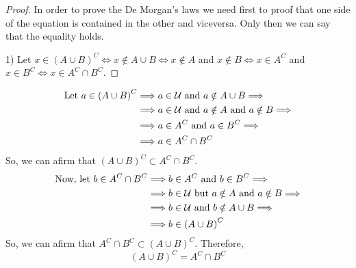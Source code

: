 \begin{proof}
    In order to prove the De Morgan's laws we need first to proof that one side of the equation is contained in the other and viceversa. Only then we can say that the equality holds.

    1) Let $x\in\left( A\cup B \right)^C \iff x\not\in A\cup B \iff x\not\in A$ and $x\not\in B \iff x\in A^C$ and $x\in B^C \iff x\in A^C\cap B^C$.
\end{proof}
    \begin{align}
        \textrm{Let } a\in\left( A\cup B \right)^C &\Longrightarrow a\in\mathcal{U}\textrm{ and } a\notin A\cup B \Longrightarrow \\
                                     &\Longrightarrow a\in\mathcal{U}\textrm{ and } a\notin A\textrm{ and } a\notin B \Longrightarrow \\ &\Longrightarrow a\in A^C\textrm{ and } a\in B^C \Longrightarrow \\
                                                         &\Longrightarrow a\in A^C\cap B^C
    \end{align}
    So, we can afirm that $\left( A\cup B \right)^C \subset A^C\cap B^C $.
    \begin{align}
        \textrm{Now, let } b\in A^C\cap B^C &\Longrightarrow b\in A^C\textrm{ and } b\in B^C \Longrightarrow \\
                                            &\Longrightarrow b\in\mathcal{U}\textrm{ but } a\notin A\textrm{ and } a\notin B \Longrightarrow \\ &\Longrightarrow b\in\mathcal{U}\textrm{ and } b\notin A\cup B \Longrightarrow \\
                                            &\Longrightarrow b\in \left( A\cup B \right)^C
    \end{align}
    So, we can afirm that $A^C\cap B^C\subset\left( A\cup B \right)^C $. Therefore,
    \begin{equation}
        \left( A\cup B \right)^C = A^C\cap B^C
    \end{equation}


